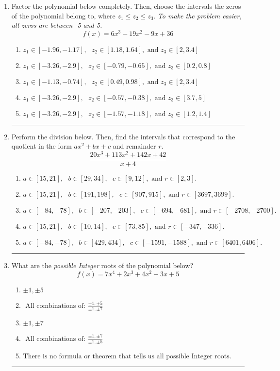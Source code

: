 \documentclass[14pt]{extbook}
\newcommand{\litem}[1]{\item#1\hspace*{-1cm}\rule{\textwidth}{0.4pt}}
\begin{document}
\begin{enumerate}
{\begin{enumerate}[label=\Alph*.]
\end{enumerate} }
\litem{
Factor the polynomial below completely. Then, choose the intervals the zeros of the polynomial belong to, where $z_1 \leq z_2 \leq z_3$. \textit{To make the problem easier, all zeros are between -5 and 5.}\[ f(x) = 6x^{3} -19 x^{2} -9 x + 36 \]\begin{enumerate}[label=\Alph*.]
\item \( z_1 \in [-1.96, -1.17], \text{   }  z_2 \in [1.18, 1.64], \text{   and   } z_3 \in [2, 3.4] \)
\item \( z_1 \in [-3.26, -2.9], \text{   }  z_2 \in [-0.79, -0.65], \text{   and   } z_3 \in [0.2, 0.8] \)
\item \( z_1 \in [-1.13, -0.74], \text{   }  z_2 \in [0.49, 0.98], \text{   and   } z_3 \in [2, 3.4] \)
\item \( z_1 \in [-3.26, -2.9], \text{   }  z_2 \in [-0.57, -0.38], \text{   and   } z_3 \in [3.7, 5] \)
\item \( z_1 \in [-3.26, -2.9], \text{   }  z_2 \in [-1.57, -1.18], \text{   and   } z_3 \in [1.2, 1.4] \)

\end{enumerate} }
\litem{
Perform the division below. Then, find the intervals that correspond to the quotient in the form $ax^2+bx+c$ and remainder $r$.\[ \frac{20x^{3} +113 x^{2} +142 x + 42}{x + 4} \]\begin{enumerate}[label=\Alph*.]
\item \( a \in [15, 21], \text{   } b \in [29, 34], \text{   } c \in [9, 12], \text{   and   } r \in [2, 3]. \)
\item \( a \in [15, 21], \text{   } b \in [191, 198], \text{   } c \in [907, 915], \text{   and   } r \in [3697, 3699]. \)
\item \( a \in [-84, -78], \text{   } b \in [-207, -203], \text{   } c \in [-694, -681], \text{   and   } r \in [-2708, -2700]. \)
\item \( a \in [15, 21], \text{   } b \in [10, 14], \text{   } c \in [73, 85], \text{   and   } r \in [-347, -336]. \)
\item \( a \in [-84, -78], \text{   } b \in [429, 434], \text{   } c \in [-1591, -1588], \text{   and   } r \in [6401, 6406]. \)

\end{enumerate} }
\litem{
What are the \textit{possible Integer} roots of the polynomial below?\[ f(x) = 7x^{4} +2 x^{3} +4 x^{2} +3 x + 5 \]\begin{enumerate}[label=\Alph*.]
\item \( \pm 1,\pm 5 \)
\item \( \text{ All combinations of: }\frac{\pm 1,\pm 5}{\pm 1,\pm 7} \)
\item \( \pm 1,\pm 7 \)
\item \( \text{ All combinations of: }\frac{\pm 1,\pm 7}{\pm 1,\pm 5} \)
\item \( \text{There is no formula or theorem that tells us all possible Integer roots.} \)

\end{enumerate} }
\end{enumerate}
\end{document}

